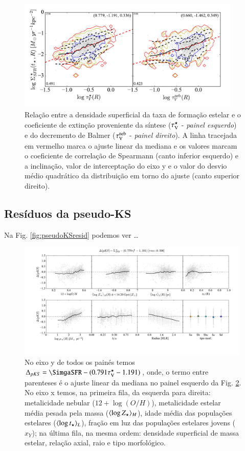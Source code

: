 \begin{figure}
	\centering
	\includegraphics[width=0.95\textwidth]{figuras/pseudoKS.pdf}
	\caption[Nossa {\em pseudo-KS}.]
	{Relação entre a densidade superficial da taxa de formação estelar e o coeficiente de extinção
proveniente da síntese ($\tau_{\mathrm{V}}^\star$ - {\em painel esquerdo}) e do decremento de Balmer ($\tau_{\mathrm{V}}^{\mathrm{neb}}$ -
{\em painel direito}). A linha tracejada em vermelho marca o ajuste linear da mediana e os
valores marcam o coeficiente de correlação de Spearmann (canto inferior esquerdo) e a
inclinação, valor de interceptação do eixo y e o valor do desvio médio quadrático da distribuição em
torno do ajuste (canto superior direito).}
	\label{fig:pseudoKS}
\end{figure}

\subsection{Resíduos da pseudo-KS}
\label{sec:gasfrac:KS:resid}
 
Na Fig. \ref{fig:pseudoKSresid} podemos ver \ldots 
\begin{figure}
	\centering
	\includegraphics[width=0.99\textwidth]{figuras/deltapKS.pdf}
	\caption[Resíduos da {\em pseudo-KS}.]
	{No eixo y de todos os painés temos $\Delta_{pKS} = \SimgaSFR - (0.791 \tauVS - 1.191)$, onde, o
termo entre parenteses é o ajuste linear da mediana no painel esquerdo da Fig. \ref{fig:pseudoKS}.
No eixo x temos, na primeira fila, da esquerda para direita: metalicidade nebular ($12 + \log
(O/H)$), metalicidade estelar média pesada pela massa ($\meanM{\log Z_\star}$), idade média das
populações estelares ($\meanL{\log t_\star}$), fração em luz das populações estelares jovens
($x_Y$); na última fila, na mesma ordem: densidade superficial de massa estelar, relação axial, raio
e tipo morfológico.}
	\label{fig:pseudoKS}
\end{figure}

